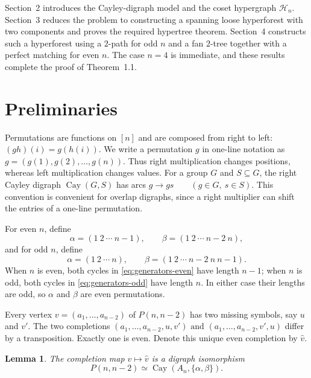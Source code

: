 \documentclass[4pt]{article} %
\newtheorem{lemma}[theorem]{Lemma}
\begin{document}
Section~2 introduces the Cayley-digraph model and the coset hypergraph
$\mathcal{H}_n$. Section~3 reduces the problem to constructing a
spanning loose hyperforest with two components and proves the required
hypertree theorem. Section~4 constructs such a hyperforest using a
$2$-path for odd $n$ and a fan $2$-tree together with a perfect
matching for even $n$. The case $n=4$ is immediate, and these results
complete the proof of Theorem~1.1.


\section{Preliminaries}\label{sec:cayley}

Permutations are functions on $[n]$ and are composed from right to left:
$(gh)(i)=g(h(i))$. We write a permutation $g$ in one-line notation as
$
 g=(g(1),g(2),\ldots,g(n)).
$
Thus right multiplication changes positions, whereas left multiplication
changes values. For a group $G$ and $S\subseteq G$, the right Cayley digraph
$\operatorname{Cay}(G,S)$ has arcs
$
 g\longrightarrow gs\qquad(g\in G,\ s\in S).
$
This convention is convenient for overlap digraphs, since a right multiplier
can shift the entries of a one-line permutation.

For even $n$, define
\begin{equation}\label{eq:generators-even}
 \alpha=(1\ 2\ \cdots\ n-1),\qquad
 \beta=(1\ 2\ \cdots\ n-2\ n),
\end{equation}
and for odd $n$, define
\begin{equation}\label{eq:generators-odd}
 \alpha=(1\ 2\ \cdots\ n),\qquad
 \beta=(1\ 2\ \cdots\ n-2\ n\ n-1).
\end{equation}
When $n$ is even, both cycles in \eqref{eq:generators-even} have length
$n-1$; when $n$ is odd, both cycles in \eqref{eq:generators-odd} have length
$n$. In either case their lengths are odd, so $\alpha$ and $\beta$ are even
permutations.

Every vertex $v=(a_1,\ldots,a_{n-2})$ of $P(n,n-2)$ has two missing symbols,
say $u$ and $v'$. The two completions
$
 (a_1,\ldots,a_{n-2},u,v')
\text{ and }
 (a_1,\ldots,a_{n-2},v',u)
$
differ by a transposition. Exactly one is even. Denote this unique even
completion by $\widehat v$.

\begin{lemma}\label{lem:cayley-isomorphism}
The completion map $v\mapsto\widehat v$ is a digraph isomorphism
\begin{equation}\label{eq:cayley-isomorphism}
 P(n,n-2)\simeq\operatorname{Cay}(A_n,\{\alpha,\beta\}).
\end{equation}
\end{lemma}
\end{document}
